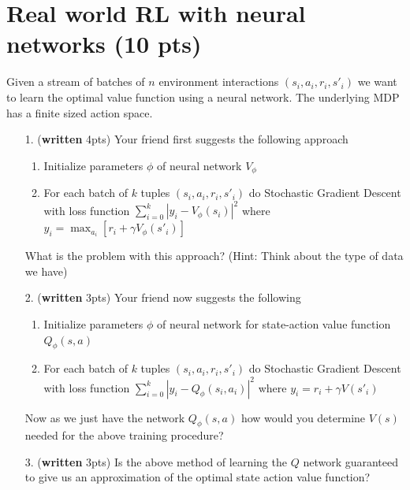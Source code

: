 \documentclass{article}
\begin{document}
\section{Real world RL with neural networks (10 pts)}
Given a stream of batches of $n$ environment interactions $(s_i,a_i,r_i,s'_i)$ we want to learn the optimal value function using a neural network. The underlying MDP has a finite sized action space.
\begin{enumerate}
\item[1.] (\textbf{written} 4pts) Your friend first suggests the following approach
\begin{enumerate}
    \item Initialize parameters \(\phi\) of neural network \(V_\phi\)
    \item For each batch of $k$ tuples $(s_i,a_i,r_i,s'_i)$ do Stochastic Gradient Descent with loss function \(\sum_{i=0}^k|y_i-V_\phi(s_i)|^2\) where \(y_i = \max_{a_i} [r_i+\gamma V_\phi(s'_i)]\)
\end{enumerate}
What is the problem with this approach? (Hint: Think about the type of data we have)
\item[2.] (\textbf{written} 3pts) Your friend now suggests the following
\begin{enumerate}
    \item Initialize parameters \(\phi\) of neural network for state-action value function \(Q_\phi(s,a)\)
    \item For each batch of $k$ tuples $(s_i,a_i,r_i,s'_i)$ do Stochastic Gradient Descent with loss function \(\sum_{i=0}
    ^k|y_i-Q_\phi(s_i,a_i)|^2\) where \(y_i = r_i+\gamma V(s'_i)\)
\end{enumerate}
Now as we just have the network $Q_\phi(s,a)$ how would you determine $V(s)$ needed for the above training procedure?
\item[3.] (\textbf{written} 3pts) Is the above method of learning the $Q$ network guaranteed to give us an approximation of the optimal state action value function?
\end{enumerate}
\end{document}
